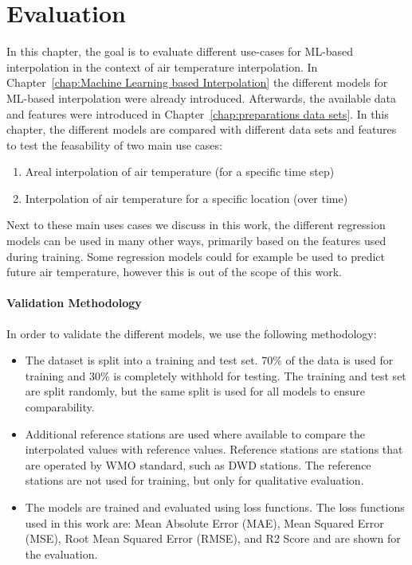 \chapter{Evaluation}
\label{chap:Evaluation}


In this chapter, the goal is to evaluate different use-cases for ML-based interpolation in the context of air temperature interpolation. In Chapter~\ref{chap:Machine Learning based Interpolation} the different models for ML-based interpolation were already introduced. Afterwards, the available data and features were introduced in Chapter~\ref{chap:preparations data sets}. In this chapter, the different models are compared with different data sets and features to test the feasability of two main use cases:

\begin{enumerate}
  \item Areal interpolation of air temperature (for a specific time step)
  \item Interpolation of air temperature for a specific location (over time)
\end{enumerate}

Next to these main uses cases we discuss in this work, the different regression models can be used in many other ways, primarily based on the features used during training. Some regression models could for example be used to predict future air temperature, however this is out of the scope of this work.

\subsubsection{Validation Methodology}

In order to validate the different models, we use the following methodology:

\begin{itemize}
  \item The dataset is split into a training and test set. 70\% of the data is used for training and 30\% is completely withhold for testing. The training and test set are split randomly, but the same split is used for all models to ensure comparability.
  \item Additional reference stations are used where available to compare the interpolated values with reference values. Reference stations are stations that are operated by WMO standard, such as DWD stations. The reference stations are not used for training, but only for qualitative evaluation.
  \item The models are trained and evaluated using loss functions. The loss functions used in this work are: Mean Absolute Error (MAE), Mean Squared Error (MSE), Root Mean Squared Error (RMSE), and R2 Score and are shown for the evaluation.
\end{itemize}

